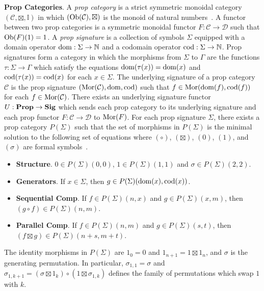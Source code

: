 \noindent
\textbf{Prop Categories}.
%
A \emph{prop category} is a strict symmetric monoidal category $( \mathcal{C}, \boxtimes, \mathbb{I} )$ in which $( \operatorname{Ob}( \mathcal{C} ), \boxtimes )$ is the monoid of natural numbers~\cite{MacLane1965}.
A functor between two prop categories is a symmetric monoidal functor $F: \mathcal{C} \to \mathcal{D}$ such that $\operatorname{Ob}( F )( 1 ) = 1$.
A \emph{prop signature} is a collection of symbols $\Sigma$ equipped with a domain operator $\operatorname{dom}: \Sigma \to \mathbb{N}$ and a codomain operator $\operatorname{cod}: \Sigma \to \mathbb{N}$.
Prop signatures form a category in which the morphisms from $\Sigma$ to $\Gamma$ are the functions $\tau: \Sigma \to \Gamma$ which satisfy the equations $\operatorname{dom}( \tau( x ) ) = \operatorname{dom}( x )$ and $\operatorname{cod}( \tau( x ) ) = \operatorname{cod}( x )$ for each $x \in \Sigma$.
The underlying signature of a prop category $\mathcal{C}$ is the prop signature $( \operatorname{Mor}( \mathcal{C} ), \operatorname{dom}, \operatorname{cod} )$ such that $f \in \operatorname{Mor}( \operatorname{dom}( f ), \operatorname{cod}( f ) )$ for each $f \in \operatorname{Mor}( \mathcal{C} )$.
There exists an underlying signature functor $U: \mathbf{Prop} \to \mathbf{Sig}$ which sends each prop category to its underlying signature and each prop functor $F: \mathcal{C} \to \mathcal{D}$ to $\operatorname{Mor}( F )$.
For each prop signature $\Sigma$, there exists a prop category $P( \Sigma )$ such that the set of morphisms in $P( \Sigma )$ is the minimal solution to the following set of equations where $( \circ )$, $( \boxtimes )$, $( 0 )$, $( 1 )$, and $( \sigma )$ are formal symbols~\cite{Clement2023}.
\begin{itemize}
\item \textbf{Structure}.
      $0 \in P( \Sigma )( 0, 0 )$, $1 \in P( \Sigma )( 1, 1 )$ and $\sigma \in P( \Sigma )( 2, 2 )$.
\item \textbf{Generators}.
      If $x \in \Sigma$, then $g \in P( \Sigma )( \operatorname{dom}( x ), \operatorname{cod}( x ) )$.
\item \textbf{Sequential Comp}.
      If $f \in P( \Sigma )( n, x )$ and $g \in P( \Sigma )( x, m )$, then $( g \circ f ) \in P( \Sigma )( n, m )$.
\item \textbf{Parallel Comp}.
      If $f \in P( \Sigma )( n, m )$ and $g \in P( \Sigma )( s, t )$, then $( f \boxtimes g ) \in P( \Sigma )( n + s, m + t )$.
\end{itemize}
The identity morphisms in $P( \Sigma )$ are $1_0 = 0$ and $1_{n+1} = 1 \boxtimes 1_{n}$, and $\sigma$ is the generating permutation.
In particular, $\sigma_{1,1} = \sigma$ and $\sigma_{1,k+1} = ( \sigma \boxtimes 1_k ) \circ ( 1 \boxtimes \sigma_{1,k} )$ defines the family of permutations which swap $1$ with $k$.
